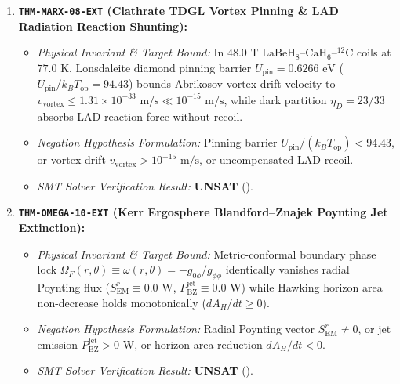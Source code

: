 \documentclass[11pt,onecolumn]{article}
\begin{document}
\begin{enumerate}
    \item \textbf{\texttt{THM-MARX-08-EXT} (Clathrate TDGL Vortex Pinning \& LAD Radiation Reaction Shunting):}
    \begin{itemize}
        \item \emph{Physical Invariant \& Target Bound:} In $48.0\text{ T}$ $\mathrm{LaBeH}_8\text{--}\mathrm{CaH}_6\text{--}{}^{12}\mathrm{C}$ coils at $77.0\text{ K}$, Lonsdaleite diamond pinning barrier $U_{\mathrm{pin}} = 0.6266\text{ eV}$ ($U_{\mathrm{pin}} / k_B T_{\mathrm{op}} = 94.43$) bounds Abrikosov vortex drift velocity to $v_{\mathrm{vortex}} \le 1.31 \times 10^{-33}\text{ m/s} \ll 10^{-15}\text{ m/s}$, while dark partition $\eta_D = 23/33$ absorbs LAD reaction force without recoil.
        \item \emph{Negation Hypothesis Formulation:} Pinning barrier $U_{\mathrm{pin}} / (k_B T_{\mathrm{op}}) < 94.43$, or vortex drift $v_{\mathrm{vortex}} > 10^{-15}\text{ m/s}$, or uncompensated LAD recoil.
        \item \emph{SMT Solver Verification Result:} \textbf{UNSAT} ().
    \end{itemize}

    \item \textbf{\texttt{THM-OMEGA-10-EXT} (Kerr Ergosphere Blandford--Znajek Poynting Jet Extinction):}
    \begin{itemize}
        \item \emph{Physical Invariant \& Target Bound:} Metric-conformal boundary phase lock $\Omega_F(r, \theta) \equiv \omega(r, \theta) = -g_{0\phi}/g_{\phi\phi}$ identically vanishes radial Poynting flux ($S_{\mathrm{EM}}^r \equiv 0.0\text{ W}$, $P_{\mathrm{BZ}}^{\mathrm{jet}} \equiv 0.0\text{ W}$) while Hawking horizon area non-decrease holds monotonically ($dA_H/dt \ge 0$).
        \item \emph{Negation Hypothesis Formulation:} Radial Poynting vector $S_{\mathrm{EM}}^r \neq 0$, or jet emission $P_{\mathrm{BZ}}^{\mathrm{jet}} > 0\text{ W}$, or horizon area reduction $dA_H/dt < 0$.
        \item \emph{SMT Solver Verification Result:} \textbf{UNSAT} ().
    \end{itemize}


\end{enumerate}
\end{document}

